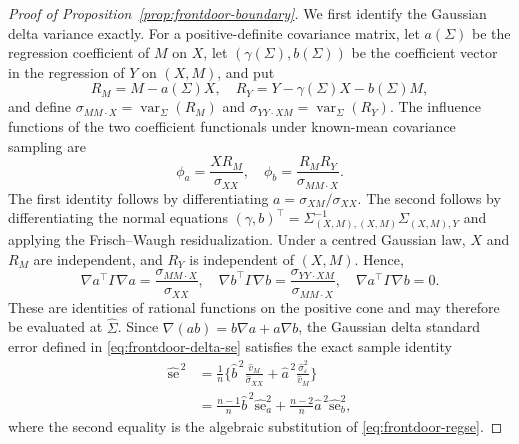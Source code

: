 \documentclass[12pt,a4paper]{article}
\theoremstyle{plain}
\theoremstyle{definition}
\newcommand{\var}{\operatorname{var}}
\newcommand{\eps}{\varepsilon}
\newcommand{\Sighat}{\hat{\Sigma}}
\begin{document}
\begin{proof}[Proof of Proposition~\ref{prop:frontdoor-boundary}]
    We first identify the Gaussian delta variance exactly.
    For a positive-definite covariance matrix, let $a(\Sigma)$ be the regression coefficient of $M$ on $X$, let $(\gamma(\Sigma),b(\Sigma))$ be the coefficient vector in the regression of $Y$ on $(X,M)$, and put
    \begin{equation*}
        R_M=M-a(\Sigma)X
        ,\quad
        R_Y=Y-\gamma(\Sigma)X-b(\Sigma)M
        ,
    \end{equation*}
    and define $\sigma_{MM\cdot X}=\var_\Sigma(R_M)$ and $\sigma_{YY\cdot XM}=\var_\Sigma(R_Y)$.
    The influence functions of the two coefficient functionals under known-mean covariance sampling are
    \begin{equation*}
        \phi_a
        =
        \frac{XR_M}{\sigma_{XX}}
        ,
        \quad
        \phi_b
        =
        \frac{R_MR_Y}{\sigma_{MM\cdot X}}
        .
    \end{equation*}
    The first identity follows by differentiating $a=\sigma_{XM}/\sigma_{XX}$.
    The second follows by differentiating the normal equations $(\gamma,b)^\top=\Sigma_{(X,M),(X,M)}^{-1}\Sigma_{(X,M),Y}$ and applying the Frisch--Waugh residualization.
    Under a centred Gaussian law, $X$ and $R_M$ are independent, and $R_Y$ is independent of $(X,M)$.
    Hence,
    \begin{equation}
        \label{eq:frontdoor-cross}
        \nabla a^\top\Gamma\nabla a
        =\frac{\sigma_{MM\cdot X}}{\sigma_{XX}}
        ,\quad
        \nabla b^\top\Gamma\nabla b
        =\frac{\sigma_{YY\cdot XM}}{\sigma_{MM\cdot X}}
        ,\quad
        \nabla a^\top\Gamma\nabla b
        =
        0
        .
    \end{equation}
    These are identities of rational functions on the positive cone and may therefore be evaluated at $\Sighat$.
    Since $\nabla(ab)=b\nabla a+a\nabla b$, the Gaussian delta standard error defined in \eqref{eq:frontdoor-delta-se} satisfies the exact sample identity
    \begin{equation}
    \label{eq:frontdoor-se-decomp}
        \begin{split}
            \widehat{\mathrm{se}}^{\,2}
            &=
            \frac{1}{n}\Biggl\{
                \hat{b}^{\,2}\frac{\hat{v}_M}{\hat{\sigma}_{XX}}
                +\hat{a}^{\,2}\frac{\hat{\sigma}_\eps^2}{\hat{v}_M}
            \Biggr\}
            \\
            &=\frac{n-1}{n}\hat{b}^{\,2}\widehat{\mathrm{se}}_a^2
            +\frac{n-2}{n}\hat{a}^{\,2}\widehat{\mathrm{se}}_b^2
            ,
        \end{split}
    \end{equation}
    where the second equality is the algebraic substitution of \eqref{eq:frontdoor-regse}.
    

\end{proof}
\end{document}
